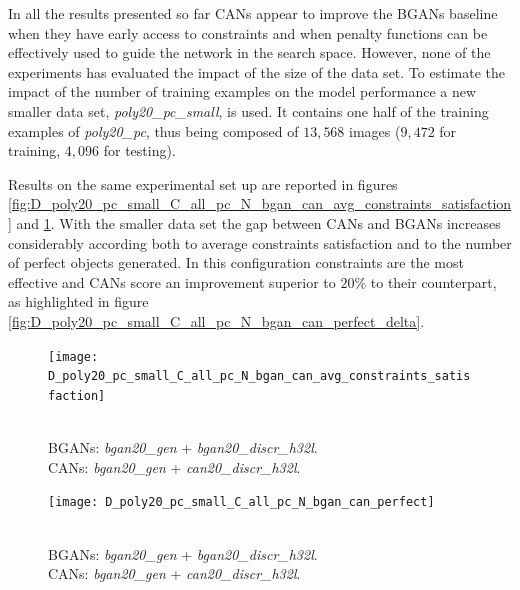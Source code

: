 In all the results presented so far CANs appear to improve the BGANs baseline when they have early access to constraints and when penalty functions can be effectively used to guide the network in the search space. However, none of the experiments has evaluated the impact of the size of the data set. To estimate the impact of the number of training examples on the model performance a new smaller data set, \textit{poly20\_pc\_small}, is used. It contains one half of the training examples of \textit{poly20\_pc}, thus being composed of $13,568$ images ($9,472$ for training, $4,096$ for testing).

Results on the same experimental set up are reported in figures \ref{fig:D_poly20_pc_small_C_all_pc_N_bgan_can_avg_constraints_satisfaction} and \ref{fig:D_poly20_pc_small_C_all_pc_N_bgan_can_perfect}. With the smaller data set the gap between CANs and BGANs increases considerably according both to average constraints satisfaction and to the number of perfect objects generated. In this configuration constraints are the most effective and CANs score an improvement superior to $20\%$ to their counterpart, as highlighted in figure  \ref{fig:D_poly20_pc_small_C_all_pc_N_bgan_can_perfect_delta}.

\begin{figure}[ht]
    \centering
    \begin{minipage}[t]{0.45\textwidth}
        \centering
        \texttt{[image: D\_poly20\_pc\_small\_C\_all\_pc\_N\_bgan\_can\_avg\_constraints\_satisfaction]}
        \caption{\\BGANs: \textit{bgan20\_gen} + \textit{bgan20\_discr\_h32l}.\\
        CANs: \textit{bgan20\_gen} + \textit{can20\_discr\_h32l}.}
        \label{fig:D_poly20_pc_small_C_all_pc_N_bgan_can_avg_constraints_satisfaction}
    \end{minipage}
    \hfill
    \begin{minipage}[t]{0.45\textwidth}
        \centering
        \texttt{[image: D\_poly20\_pc\_small\_C\_all\_pc\_N\_bgan\_can\_perfect]}
        \caption{\\BGANs: \textit{bgan20\_gen} + \textit{bgan20\_discr\_h32l}.\\
        CANs: \textit{bgan20\_gen} + \textit{can20\_discr\_h32l}.}
        \label{fig:D_poly20_pc_small_C_all_pc_N_bgan_can_perfect}
    \end{minipage}
\end{figure}

